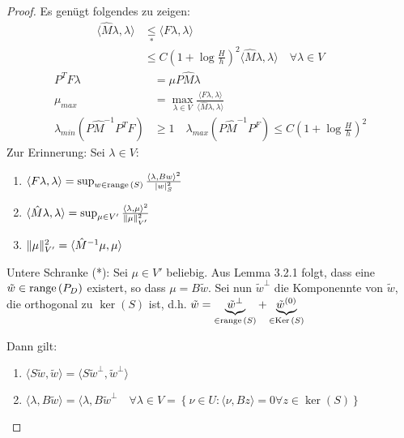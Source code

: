 \begin{proof}
  Es genügt folgendes zu zeigen: 
  \begin{align*}
    \langle \hat{M}\lambda,\lambda\rangle &\underset{*}{\leq} \langle F\lambda,\lambda\rangle\\
    &\leq C(1+\log \frac{H}{h})^2 \langle \hat{M}\lambda,\lambda\rangle \quad \forall \lambda\in V
  \end{align*}
  \begin{align*}
    P^TF\lambda&=\mu P \hat{M}\lambda \\
    \mu_{max} &= \max_{\lambda\in V} \frac{\langle F\lambda,\lambda\rangle}{\langle\hat{M}\lambda,\lambda\rangle} \\
    \lambda_{min}(P\hat{M}^{-1}P^TF) &\geq 1 \quad    \lambda_{max}(P\hat{M}^{-1}P^F) \leq C(1+\log \frac{H}{h})^2
  \end{align*}
  Zur Erinnerung: Sei $\lambda\in V$:
  \begin{enumerate}
      \item
        $
          \langle F\lambda,\lambda\rangle = \sup_{w\in\textnormal{range}\,(S)} \frac{\langle\lambda,Bw\rangle^2}{|w|_S^2}
        $
      \item
        $
          \langle\hat{M}\lambda,\lambda\rangle = \sup_{\mu \in V'} \frac{\langle\lambda,\mu\rangle^2}{\|\mu\|_{V'}^2}
        $
      \item 
        $
          \|\mu\|_{V'}^2 = \langle\hat{M}^{-1}\mu,\mu\rangle
        $
  \end{enumerate}

  Untere Schranke (*): 
  Sei $\mu\in V'$ beliebig. Aus Lemma 3.2.1 folgt, dass eine $\tilde{w}\in\textnormal{range}\,(P_D)$ existert, so dass $\mu=B\tilde{w}$. Sei nun $\tilde{w}^{\perp}$ die Komponennte von $\tilde{w}$, die orthogonal zu $\ker(S)$ ist, d.h. $\tilde{w}=\underbrace{\tilde{w}^{\perp}}_{\in\textnormal{range}\,(S)} + \underbrace{\tilde{w}^{(0)}}_{\in\textnormal{Ker}\,(S)}$

  Dann gilt: 
  \begin{enumerate}
    \item $\langle S\tilde{w},\tilde{w}\rangle = \langle S\tilde{w}^{\perp},\tilde{w}^{\perp} \rangle$
    \item $\langle\lambda,B\tilde{w}\rangle = \langle\lambda,B\tilde{w}^{\perp} \quad \forall \lambda\in V = \left\{ \nu\in U: \langle\nu,Bz\rangle =0 \forall z\in\ker(S) \right\}$
  \end{enumerate}


\end{proof}
